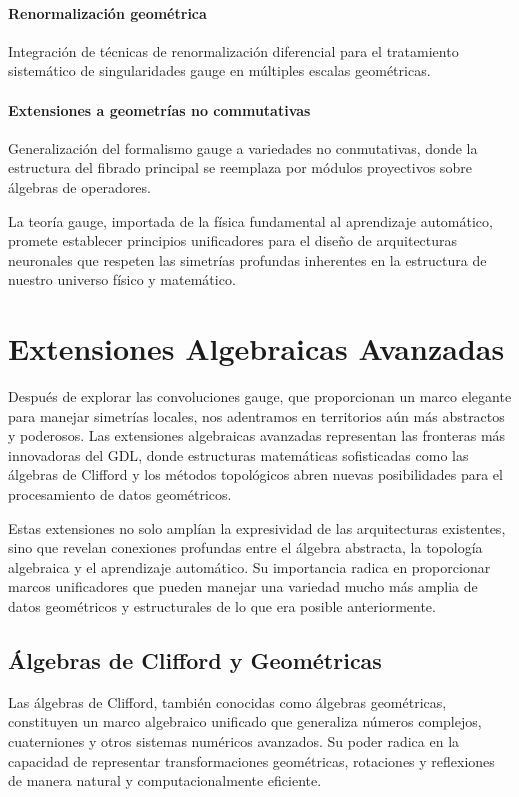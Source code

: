 \paragraph{Renormalización geométrica}
Integración de técnicas de renormalización diferencial para el tratamiento sistemático de singularidades gauge en múltiples escalas geométricas.

\paragraph{Extensiones a geometrías no commutativas}
Generalización del formalismo gauge a variedades no conmutativas, donde la estructura del fibrado principal se reemplaza por módulos proyectivos sobre álgebras de operadores.

La teoría gauge, importada de la física fundamental al aprendizaje automático, promete establecer principios unificadores para el diseño de arquitecturas neuronales que respeten las simetrías profundas inherentes en la estructura de nuestro universo físico y matemático.

\section{Extensiones Algebraicas Avanzadas}\label{sec:algebraic_extensions}

Después de explorar las convoluciones gauge, que proporcionan un marco elegante para manejar simetrías locales, nos adentramos en territorios aún más abstractos y poderosos. Las extensiones algebraicas avanzadas representan las fronteras más innovadoras del \gls{GDL}, donde estructuras matemáticas sofisticadas como las álgebras de Clifford y los métodos topológicos abren nuevas posibilidades para el procesamiento de datos geométricos.

Estas extensiones no solo amplían la expresividad de las arquitecturas existentes, sino que revelan conexiones profundas entre el álgebra abstracta, la topología algebraica y el aprendizaje automático. Su importancia radica en proporcionar marcos unificadores que pueden manejar una variedad mucho más amplia de datos geométricos y estructurales de lo que era posible anteriormente.

\subsection{Álgebras de Clifford y Geométricas}

Las álgebras de Clifford, también conocidas como álgebras geométricas, constituyen un marco algebraico unificado que generaliza números complejos, cuaterniones y otros sistemas numéricos avanzados. Su poder radica en la capacidad de representar transformaciones geométricas, rotaciones y reflexiones de manera natural y computacionalmente eficiente.

